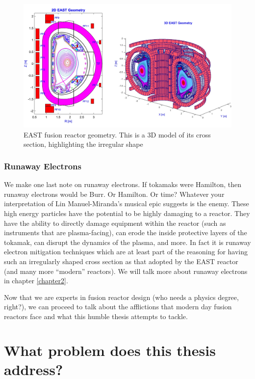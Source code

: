 \begin{figure}[h!]
    \centering
    \includegraphics[scale=0.2]{imgs/c1/east-cross-section.png}
    \caption{EAST fusion reactor geometry. This is a 3D model of its cross section, highlighting the irregular shape \cite{east-geometry-article}}
    \label{fig:east-geometry}
\end{figure}\newpage

\subsubsection{Runaway Electrons}
We make one last note on runaway electrons. If tokamaks were Hamilton, then runaway electrons would be Burr. Or Hamilton. Or time? 
Whatever your interpretation of Lin Manuel-Miranda's musical epic suggests is the enemy. These high energy particles have the 
potential to be highly damaging to a reactor. They have the ability to directly damage equipment within the reactor (such 
as instruments that are plasma-facing), can erode the inside protective layers of the tokamak, can 
disrupt the dynamics of the plasma, and more. In fact it is runaway electron mitigation 
techniques which are at least part of the reasoning for having such an irregularly shaped 
cross section as that adopted by the EAST reactor (and many more ``modern'' reactors). We will talk more about runaway electrons in chapter \ref{chapter2}.

Now that we are experts in fusion reactor design (who needs a physics degree, right?), we can proceed to talk about the 
afflictions that modern day fusion reactors face and what this humble thesis attempts to tackle.

\section{What problem does this thesis address?}

